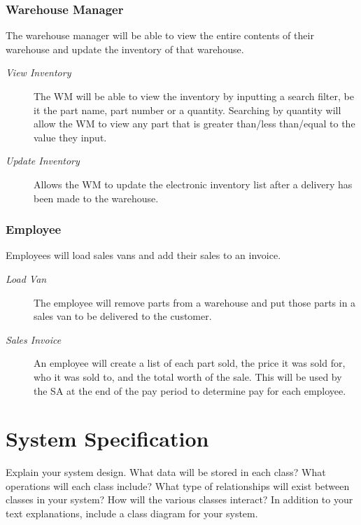 \documentclass{report}
\begin{document}
\subsubsection{Warehouse Manager}
\label{sec:wm}
The warehouse manager will be able to view the entire contents of their warehouse and update the inventory of that warehouse.\par
\begin{description}
  \item[\textit{View Inventory}] The WM will be able to view the inventory by inputting a search filter, be it the part name, part number or a quantity. Searching by quantity will allow the WM to view any part that is greater than/less than/equal to the value they input.\par
  \item[\textit{Update Inventory}] Allows the WM to update the electronic inventory list after a delivery has been made to the warehouse.\par
\end{description}
\subsubsection{Employee}
\label{sec:emp}
Employees will load sales vans and add their sales to an invoice.\par
\begin{description}
  \item[\textit{Load Van}] The employee will remove parts from a warehouse and put those parts in a sales van to be delivered to the customer.\par
  \item[\textit{Sales Invoice}] An employee will create a list of each part sold, the price it was sold for, who it was sold to, and the total worth of the sale. This will be used by the SA at the end of the pay period to determine pay for each employee.\par
\end{description}
\section{System Specification}
\label{sec:spec}
Explain your system design. What data will be stored in each class?  What operations will each class include?  What type of relationships will exist between classes in your system? How will the various classes interact? In addition to your text explanations, include a class diagram for your system.\par
\end{document}
